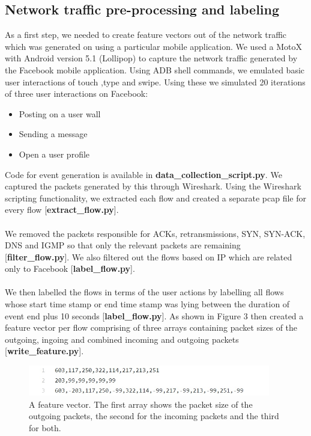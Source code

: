 \documentclass[12pt]{article}
\begin{document}
\subsection{Network traffic pre-processing and labeling }
As a first step, we needed to create feature vectors out of the network traffic which was generated on using a particular mobile application. We used a MotoX with Android version 5.1 (Lollipop) to capture the network traffic generated by the Facebook mobile application. Using ADB shell commands, we emulated basic user interactions of touch ,type and swipe. Using these we simulated 20 iterations of three user interactions on Facebook:
\begin{itemize}
    \item Posting on a user wall
    \item Sending a message
    \item Open a user profile
\end{itemize}
Code for event generation is available in \textbf{data\_collection\_script.py}. 
We captured the packets generated by this through Wireshark. Using the Wireshark scripting functionality, we extracted each flow and created a separate pcap file for every flow [\textbf{extract\_flow.py}]. \\\\
We removed the packets responsible for ACKs, retransmissions, SYN, SYN-ACK, DNS and IGMP so that only the relevant packets are remaining [\textbf{filter\_flow.py}]. We also filtered out the flows based on IP which are related only to Facebook [\textbf{label\_flow.py}]. \\\\
We then labelled the flows in terms of the user actions by labelling all flows whose start time stamp or end time stamp was lying between the duration of event end plus 10 seconds [\textbf{label\_flow.py}].
As shown in Figure 3 then created a feature vector per flow comprising of three arrays containing packet sizes of the outgoing, ingoing and combined incoming and outgoing packets [\textbf{write\_feature.py}].

\begin{figure}[h]
    \begin{center}
       \includegraphics[width=400px]{feature.jpg}
    \end{center}
       \caption{A feature vector. The first array shows the packet size of the outgoing packets, the second for the incoming packets and the third for both. }
    \label{fig:long}
    \label{fig:onecol}
    \end{figure}
\end{document}
